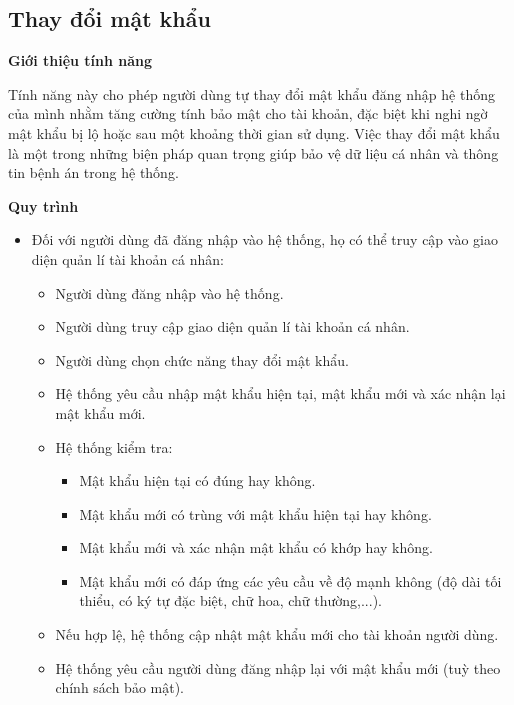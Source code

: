 \subsection{Thay đổi mật khẩu}

\noindent \textbf{Giới thiệu tính năng}

Tính năng này cho phép người dùng tự thay đổi mật khẩu đăng nhập hệ thống của mình nhằm tăng cường tính bảo mật cho tài khoản, đặc biệt khi nghi ngờ mật khẩu bị lộ hoặc sau một khoảng thời gian sử dụng. Việc thay đổi mật khẩu là một trong những biện pháp quan trọng giúp bảo vệ dữ liệu cá nhân và thông tin bệnh án trong hệ thống.

\noindent \textbf{Quy trình}

\begin{itemize}
  \item Đối với người dùng đã đăng nhập vào hệ thống, họ có thể truy cập vào giao diện quản lí tài khoản cá nhân:
    \begin{itemize}

      \item Người dùng đăng nhập vào hệ thống.

      \item Người dùng truy cập giao diện quản lí tài khoản cá nhân.

      \item Người dùng chọn chức năng thay đổi mật khẩu.

      \item Hệ thống yêu cầu nhập mật khẩu hiện tại, mật khẩu mới và xác nhận lại mật khẩu mới.

      \item Hệ thống kiểm tra:

        \begin{itemize}
          \item Mật khẩu hiện tại có đúng hay không.
          \item Mật khẩu mới có trùng với mật khẩu hiện tại hay không.
          \item Mật khẩu mới và xác nhận mật khẩu có khớp hay không.
          \item Mật khẩu mới có đáp ứng các yêu cầu về độ mạnh không (độ dài tối thiểu, có ký tự đặc biệt, chữ hoa, chữ thường,...).
        \end{itemize}

      \item Nếu hợp lệ, hệ thống cập nhật mật khẩu mới cho tài khoản người dùng.

      \item Hệ thống yêu cầu người dùng đăng nhập lại với mật khẩu mới (tuỳ theo chính sách bảo mật).


\end{itemize}
\end{itemize}
